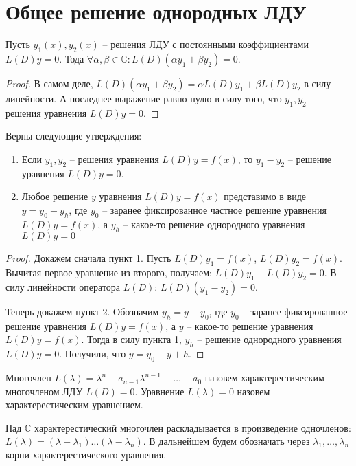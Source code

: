 \documentclass[document.tex]{subfiles}
\begin{document}
\section{Общее решение однородных ЛДУ}

\begin{lemma}
Пусть $y_1(x), y_2(x)$ -- решения ЛДУ с постоянными коэффициентами $L(D)y = 0$. Тода
$\forall \alpha, \beta \in \mathbb{C}: L(D)(\alpha y_1 + \beta y_2) = 0$.
\end{lemma}
\begin{proof}
В самом деле, $L(D)(\alpha y_1 + \beta y_2) = \alpha L(D) y_1 + \beta L(D) y_2$ в силу линейности. А последнее выражение равно нулю в силу того, что $y_1, y_2$ -- решения уравнения $L(D)y = 0$.
\end{proof}
\begin{theorem}
Верны следующие утверждения:
\begin{enumerate}
\item Если $y_1, y_2$ -- решения уравнения $L(D)y = f(x)$, то $y_1 - y_2$ -- решение уравнения $L(D)y = 0$.
\item Любое решение $y$ уравнения $L(D)y = f(x)$ представимо в виде $y = y_0 + y_h$, где $y_0$ -- заранее фиксированное частное решение уравнения $L(D)y = f(x)$, а $y_h$ -- какое-то решение однородного уравнения $L(D)y = 0$
\end{enumerate}
\end{theorem}
\begin{proof}
Докажем сначала пункт 1. Пусть $L(D)y_1 = f(x)$, $L(D)y_2 = f(x)$. Вычитая первое уравнение из второго, получаем: $L(D)y_1 - L(D)y_2 = 0$. В силу линейности оператора $L(D)$: $L(D)(y_1 - y_2) = 0$.

Теперь докажем пункт 2. Обозначим $y_h = y - y_0$, где $y_0$ -- заранее фиксированное решение уравнения $L(D)y = f(x)$, а $y$ -- какое-то решение уравнения $L(D)y = f(x)$. Тогда в силу пункта 1, $y_h$ -- решение однородного уравнения $L(D)y = 0$. Получили, что $y = y_0 + y+h$.
\end{proof}
\begin{definition}
Многочлен $L(\lambda) = \lambda^n + a_{n-1} \lambda^{n - 1} + \ldots + a_0$ назовем характерестическим многочленом ЛДУ $L(D) = 0$. Уравнение $L(\lambda) = 0$ назовем характерестическим уравнением.
\end{definition}

\begin{remark}
Над $\mathbb{C}$ характерестический многочлен раскладывается в произведение одночленов: $L(\lambda) = (\lambda - \lambda_1)\ldots(\lambda - \lambda_n)$. В дальнейшем будем обозначать через $\lambda_1, \ldots, \lambda_n$ корни характерестического уравнения.
\end{remark}
\end{document}
